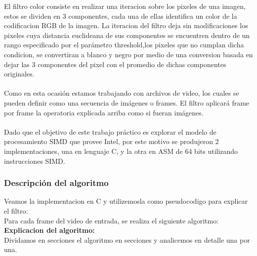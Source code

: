 El filtro color consiste en realizar una iteracion sobre los pixeles de una imagen, estos se dividen en 3 componentes, cada una de ellas identifica un color de la codificacion RGB de la imagen. La iteracion del filtro deja sin modificaciones
los pixeles cuya distancia euclideana de sus componentes se encuentren dentro de un rango especificado por el par\'ametro threshold,los pixeles que no cumplan dicha condicion, se convertiran a blanco y negro por medio de una conversion basada en dejar las 3 componentes del pixel con el promedio de dichas componentes originales.
\\
\\
Como en esta ocasi\'on estamos trabajando con archivos de video, los cuales se pueden definir como una secuencia
de im\'agenes o frames. El filtro aplicar\'a frame por frame la operatoria explicada arriba como si fueran im\'agenes.
\\
\\
Dado que el objetivo de este trabajo pr\'actico es explorar el modelo de procesamiento SIMD que provee Intel, por este motivo se produjeron 2 implementaciones, una en lenguaje C, y la otra en ASM de 64 bits utilizando instrucciones SIMD.
\\


\subsubsection{Descripción del algoritmo}

Veamos la implementacion en C y utilizemosla como pseudocodigo para explicar el filtro:\\
Para cada frame del video de entrada, se realiza el siguiente algoritmo:\\



\textbf{Explicacion del algoritmo:}\\ Dividamos en secciones el algoritmo en secciones y analicemos en detalle una por una.\\

